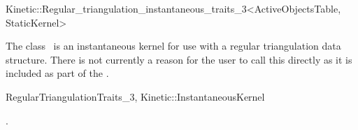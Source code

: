 

\begin{ccRefClass}{Kinetic::Regular_triangulation_instantaneous_traits_3<ActiveObjectsTable, StaticKernel>}  %


\ccDefinition
  
The class \ccRefName\ is an instantaneous kernel for use with a
regular triangulation data structure. There is not currently a reason
for the user to call this directly as it is included as part of the
.


\ccIsModel

RegularTriangulationTraits\_3, Kinetic::InstantaneousKernel

\ccSeeAlso

.

\end{ccRefClass}


